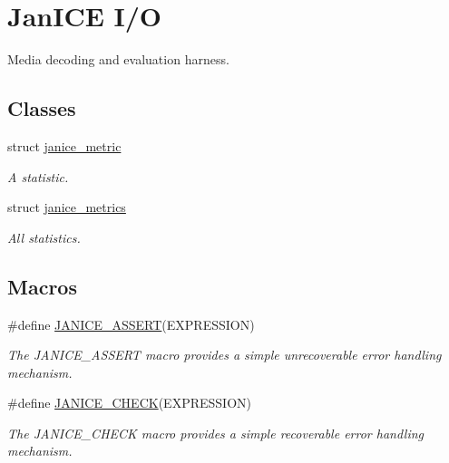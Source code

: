 \hypertarget{group__janice__io}{}\section{Jan\+I\+C\+E I/\+O}
\label{group__janice__io}


Media decoding and evaluation harness.  


\subsection*{Classes}
\begin{DoxyCompactItemize}
\item 
struct \hyperlink{structjanice__metric}{janice\+\_\+metric}
\begin{DoxyCompactList}\small\item\em A statistic. \end{DoxyCompactList}\item 
struct \hyperlink{structjanice__metrics}{janice\+\_\+metrics}
\begin{DoxyCompactList}\small\item\em All statistics. \end{DoxyCompactList}\end{DoxyCompactItemize}
\subsection*{Macros}
\begin{DoxyCompactItemize}
\item 
\#define \hyperlink{group__janice__io_ga39a97708cd80add78fa1fccf8b23c6f3}{J\+A\+N\+I\+C\+E\+\_\+\+A\+S\+S\+E\+R\+T}(E\+X\+P\+R\+E\+S\+S\+I\+O\+N)                                                                      
\begin{DoxyCompactList}\small\item\em The {\ttfamily J\+A\+N\+I\+C\+E\+\_\+\+A\+S\+S\+E\+R\+T} macro provides a simple unrecoverable error handling mechanism. \end{DoxyCompactList}\item 
\#define \hyperlink{group__janice__io_ga2d8bd9514bf7749699990e03827a2a07}{J\+A\+N\+I\+C\+E\+\_\+\+C\+H\+E\+C\+K}(E\+X\+P\+R\+E\+S\+S\+I\+O\+N)                      
\begin{DoxyCompactList}\small\item\em The {\ttfamily J\+A\+N\+I\+C\+E\+\_\+\+C\+H\+E\+C\+K} macro provides a simple recoverable error handling mechanism. \end{DoxyCompactList}\end{DoxyCompactItemize}

